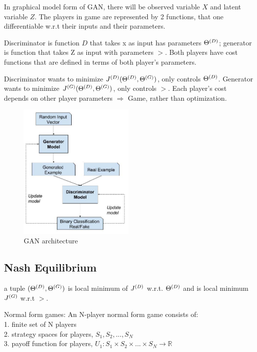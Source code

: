 \documentclass[12pt,a4paper]{article}
\begin{document}
In graphical model form of GAN, there will be observed variable $X$ and latent variable $Z$. The players in game are represented by 2 functions, that one differentiable w.r.t their inputs and their parameters. 

Discriminator is function $D$ that takes x as input has parameters ${\Theta^{(D)}}$; generator is function that takes Z as input with parameters $\gt$. 
Both players have cost functions that are defined in terms of both player's parameters. 

Discriminator wants to minimize $J^{(D)}({\Theta^{(D)}},{\Theta^{(G)}})$, only controls ${\Theta^{(D)}}$. Generator wants to minimize $J^{(G)}({\Theta^{(D)}},{\Theta^{(G)}})$, only controls $\gt$. 
Each player's cost depends on other player parameters $\Rightarrow$ Game, rather than optimization. 

\begin{figure}[!ht]
    \centering
    \includegraphics[width=0.5\textwidth]{fig/gan_arch.jpg}
    \caption{GAN architecture}
\end{figure}

\vspace{0.5cm}
\subsection{Nash Equilibrium}
a tuple $({\Theta^{(D)}}, {\Theta^{(G)}})$ is local minimum of $J^{(D)}$ w.r.t. ${\Theta^{(D)}}$ and is local minimum $J^{(G)}$ w.r.t $\gt$. 

Normal form games: An N-player normal form game consists of:\\
1. finite set of N players\\
2. strategy spaces for players, $S_1, S_2, ..., S_N$\\
3. payoff function for players, $U_1: S_1\times S_2\times...\times S_N\rightarrow \mathbb{R}$
\end{document}
